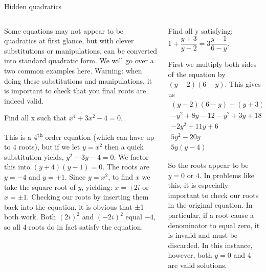 \documentclass[9pt,aspectratio=169]{beamer}
\begin{document}
\begin{frame}{Hidden quadratics}
  \begin{columns}[T]
    \begin{column}{0.5\textwidth}
      Some equations may not appear to be quadratics at first glance, but with clever substitutions or manipulations, can be converted into standard quadratic form.  We will go over a two common examples here.  Warning: when doing these substitutions and manipulations, it is important to check that you final roots are indeed valid.
      \begin{problem}
        Find all x such that $x^4 + 3x^2 - 4 = 0$.
      \end{problem}
      This is a $4$\textsuperscript{th} order equation (which can have up to $4$ roots), but if we let $y = x^2$ then a quick substitution yields, $y^2 +3y - 4 = 0$.  We factor this into $(y + 4)(y - 1) = 0.$  The roots are $y = -4$ and $y = +1$.  Since $y = x^2$, to find $x$ we take the square root of $y$, yielding:  $x = \pm 2i$ or $x = \pm 1$.  Checking our roots by inserting them back into the equation, it is obvious that ±1 both work. Both $(2i)^2$ and $(-2i)^2$ equal $-4$, so all $4$ roots do in fact satisfy the equation.
    \end{column}
    \begin{column}{0.5\textwidth}
      \begin{problem}
        Find all y satisfying:
        $1 + \dfrac{y + 3}{y - 2} =  3\dfrac{y - 1}{6 - y}.$
      \end{problem}
      First we multiply both sides of the equation by 	
      $(y - 2)(6 - y)$.  This gives us 
      \begin{align*}
        (y - 2)(6 - y) + (y + 3)(6 - y) &= 3(y - 2)(y - 1)\\
        -y^2 + 8y - 12 - y^2 + 3y + 18 &= 3y^2 -9y + 6\\
        -2y^2 + 11y + 6 &= 3y^2 - 9y + 6\\
        5y^2 - 20y &= 0\\
        5y(y - 4) &= 0        
      \end{align*}
      
      So the roots appear to be $y = 0$ or $4$.  In problems like this, it is especially important to check our roots in the original equation.  In particular, if a root cause a denominator to equal zero, it is invalid and must be discarded.  In this instance, however, both $y = 0$ and $4$ are valid solutions.
    \end{column}
  \end{columns}
\end{frame}
\end{document}
